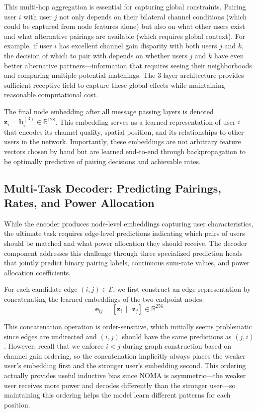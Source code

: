 This multi-hop aggregation is essential for capturing global constraints. Pairing user $i$ with user $j$ not only depends on their bilateral channel conditions (which could be captured from node features alone) but also on what other users exist and what alternative pairings are available (which requires global context). For example, if user $i$ has excellent channel gain disparity with both users $j$ and $k$, the decision of which to pair with depends on whether users $j$ and $k$ have even better alternative partners—information that requires seeing their neighborhoods and comparing multiple potential matchings. The 3-layer architecture provides sufficient receptive field to capture these global effects while maintaining reasonable computational cost.

The final node embedding after all message passing layers is denoted $\mathbf{z}_i = \mathbf{h}_i^{(3)} \in \mathbb{R}^{128}$. This embedding serves as a learned representation of user $i$ that encodes its channel quality, spatial position, and its relationships to other users in the network. Importantly, these embeddings are not arbitrary feature vectors chosen by hand but are learned end-to-end through backpropagation to be optimally predictive of pairing decisions and achievable rates.

\subsection{Multi-Task Decoder: Predicting Pairings, Rates, and Power Allocation}

While the encoder produces node-level embeddings capturing user characteristics, the ultimate task requires edge-level predictions indicating which pairs of users should be matched and what power allocation they should receive. The decoder component addresses this challenge through three specialized prediction heads that jointly predict binary pairing labels, continuous sum-rate values, and power allocation coefficients.

For each candidate edge $(i,j) \in \mathcal{E}$, we first construct an edge representation by concatenating the learned embeddings of the two endpoint nodes:
\begin{equation}
\mathbf{e}_{ij} = [\mathbf{z}_i \,\|\, \mathbf{z}_j] \in \mathbb{R}^{256}
\end{equation}

This concatenation operation is order-sensitive, which initially seems problematic since edges are undirected and $(i,j)$ should have the same predictions as $(j,i)$. However, recall that we enforce $i < j$ during graph construction based on channel gain ordering, so the concatenation implicitly always places the weaker user's embedding first and the stronger user's embedding second. This ordering actually provides useful inductive bias since NOMA is asymmetric—the weaker user receives more power and decodes differently than the stronger user—so maintaining this ordering helps the model learn different patterns for each position.

